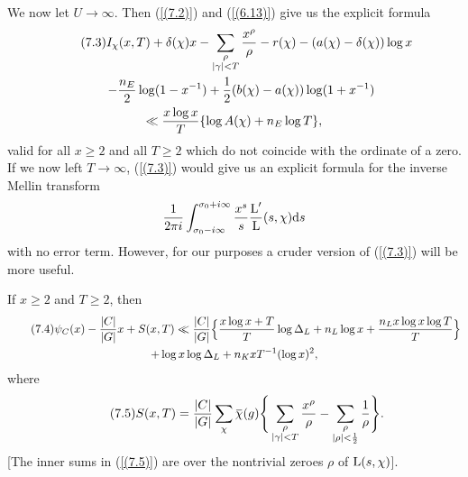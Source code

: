 \documentclass[./main]{subfiles}
\begin{document}
We now let $U \to  \infty$. Then (\ref{(7.2)}) and (\ref{(6.13)}) give us the explicit formula 
\begin{multline}\tag{7.3}\label{(7.3)}
    I_{\chi}(x,T) + \delta(\chi)x - \sum_{\substack{\rho \\ |\gamma| < T}} \frac{x^{\rho}}{\rho} - r(\chi) - (a(\chi) - \delta(\chi))\log x \\ \hfill- \frac{n_E}{2} \log(1 - x^{-1}) + \frac{1}{2}(b(\chi)-a(\chi))\log(1+x^{-1}) \quad\quad\quad
    \\
    \Vinogradov \frac{x \log x}{T} \{\log A(\chi) + n_E \log T\},
\end{multline}
valid for all $x \geq 2$ and all $T \geq 2$ which do not coincide with the ordinate of a zero. If we now left $T \to \infty$, (\ref{(7.3)}) would give us an explicit formula for the inverse Mellin transform 
\[ \frac{1}{2\pi i} \int_{\sigma_{0}-i\infty}^{\sigma_{0}+ i \infty} \frac{x^s}{s}\frac{\operatorname{L}'}{\operatorname{L}}(s, \chi) \mathrm{d}{s}
\]
with no error term. However, for our purposes a cruder version of (\ref{(7.3)}) will be more useful.
\begin{theorem}\label{7.1}\label{07-THM-7.1}
If $x \geq 2$ and $T \geq 2$, then 
\begin{multline}\tag{7.4}\label{(7.4)} 
\psi_{C}(x) - \frac{|C|}{|G|}x  + S(x,T)
\ll \frac{|C|}{|G|} \Big\{\frac{x \log x + T}{T}\log \Delta_L  + n_L \log x+ \frac{n_L x \log x \log T}{T} \Big\}\\ + \log x \log \Delta_L  + n_KxT^{-1}(\log x)^2,
\end{multline}
where 
\[\tag{7.5}\label{(7.5)} S(x, T) = \frac{|C|}{|G|} \sum_{\chi} \xoverline{\chi}(g) \Bigg\{ \sum_{\substack{\rho \\ |\gamma| < T}} \frac{x^\rho}{\rho} - \sum_{\substack{\rho \\ |\rho| < \frac{1}{2}}} \frac{1}{\rho} \Bigg\}.
\]
[The inner sums in (\ref{(7.5)}) are over the nontrivial zeroes $\rho$ of $\operatorname{L}(s, \chi)$]. 
\end{theorem}
\end{document}
